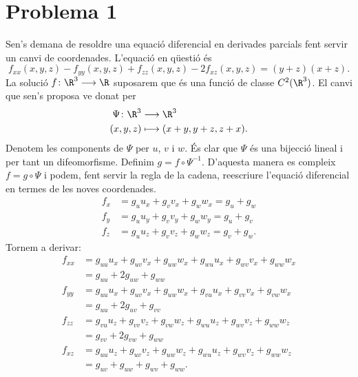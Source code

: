 \section*{Problema 1} \label{sec:problema 1}
Sen's demana de resoldre una equació diferencial en derivades parcials fent servir un canvi de coordenades. L'equació en qüestió és 
\begin{equation}
  f_{xx}(x,y,z) - f_{yy}(x,y,z) + f_{zz}(x,y,z) - 2f_{xz}(x,y,z) = (y + z)(x + z) \label{eq:eq diferencial}.
\end{equation}
La solució \( f \colon \R^3 \longrightarrow \R \) suposarem que és una funció de classe \( C^2(\R^3) \). El canvi que sen's proposa ve donat per
\begin{equation}
	\begin{aligned}
		\Psi \colon \R^3 & \longrightarrow \R^3 \\  
		(x,y,z) & \longmapsto (x+y, y+z, z+x) .
	\end{aligned} 
	\label{eq:canvi de variables}
\end{equation}
Denotem les components de \( \Psi \) per \( u \), \( v \) i \( w \). És clar que \( \Psi \) és una bijecció lineal i per tant un difeomorfisme. Definim \( g = f \circ \Psi^{-1} \). D'aquesta manera es compleix \( f = g \circ \Psi \) i podem, fent servir la regla de la cadena, reescriure l'equació diferencial en termes de les noves coordenades. 
\begin{equation}
	\begin{aligned}
  	f_x &= g_u u_x + g_v v_x + g_w w_x = g_u + g_w \\
  	f_y &= g_u u_y + g_v v_y + g_w w_y = g_u + g_v \\
  	f_z &= g_u u_z + g_v v_z + g_w w_z = g_v + g_w. 
	\end{aligned}
	\label{eq:primeres derivades}
\end{equation}
Tornem a derivar:
\begin{align*}
	f_{xx} &= g_{uu}u_x + g_{uv}v_x + g_{uw}w_x + g_{wu}u_x + g_{wv}v_x + g_{ww}w_x  \\
				 &= g_{uu} + 2g_{uw} + g_{ww} \\
	f_{yy} &= g_{uu}u_x + g_{uv}v_x + g_{uw}w_x + g_{vu}u_x + g_{vv}v_x + g_{vw}w_x  \\
				 &= g_{uu} + 2g_{uv} + g_{vv} \\
	f_{zz} &= g_{vu}u_z + g_{vv}v_z + g_{vw}w_z + g_{wu}u_z + g_{wv}v_z + g_{ww}w_z  \\
				 &= g_{vv} + 2g_{vw} + g_{ww} \\
	f_{xz} &= g_{uu}u_z + g_{uv}v_z + g_{uw}w_z + g_{wu}u_z + g_{wv}v_z + g_{ww}w_z  \\
				 &= g_{uv} + g_{uw} + g_{wv} + g_{ww}. \\
\end{align*}
